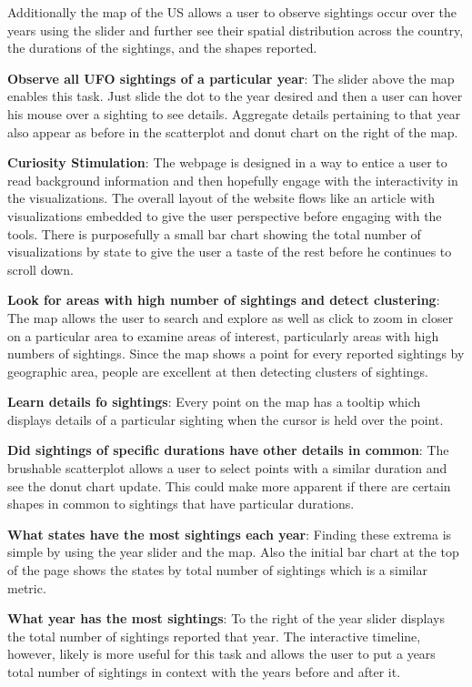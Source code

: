 \documentclass[journal]{vgtc}                %
\begin{document}
Additionally the map of the US allows a user to observe sightings occur over the years using the slider and further see their spatial distribution across the country, the durations of the sightings, and the shapes reported.

\textbf{Observe all UFO sightings of a particular year}: The slider above the map enables this task. Just slide the dot to the year desired and then a user can hover his mouse over a sighting to see details. Aggregate details pertaining to that year also appear as before in the scatterplot and donut chart on the right of the map.

\textbf{Curiosity Stimulation}: The webpage is designed in a way to entice a user to read background information and then hopefully engage with the interactivity in the visualizations. The overall layout of the website flows like an article with visualizations embedded to give the user perspective before engaging with the tools. There is purposefully a small bar chart showing the total number of visualizations by state to give the user a taste of the rest before he continues to scroll down.

\textbf{Look for areas with high number of sightings and detect clustering}: The map allows the user to search and explore as well as click to zoom in closer on a particular area to examine areas of interest, particularly areas with high numbers of sightings. Since the map shows a point for every reported sightings by geographic area, people are excellent at then detecting clusters of sightings. 

\textbf{Learn details fo sightings}: Every point on the map has a tooltip which displays details of a particular sighting when the cursor is held over the point.

\textbf{Did sightings of specific durations have other details in common}: The brushable scatterplot allows a user to select points with a similar duration and see the donut chart update. This could make more apparent if there are certain shapes in common to sightings that have particular durations.

\textbf{What states have the most sightings each year}: Finding these extrema is simple by using the year slider and the map. Also the initial bar chart at the top of the page shows the states by total number of sightings which is a similar metric.

\textbf{What year has the most sightings}: To the right of the year slider displays the total number of sightings reported that year. The interactive timeline, however, likely is more useful for this task and allows the user to put a years total number of sightings in context with the years before and after it.
\end{document}
